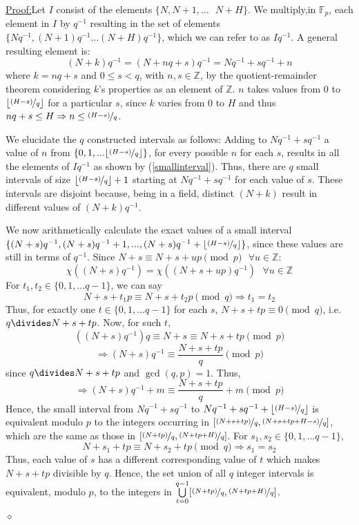 \documentclass{report}
\newenvironment{claimproof}[1]{\vspace{2.5mm}\par\noindent\underline{Proof:}\space#1}{\hfill $\diamond$ \vspace{2.5mm} \par}
\begin{document}
\begin{claimproof}
Let $I$ consist of the elements $\{N,N+1,...\text{ }N+H\}$. We multiply,in $\mathbb{F}_p$, each element in $I$ by $q^{-1}$ resulting in the set of elements $\{Nq^{-1},(N+1)q^{-1}...(N+H)q^{-1}\}$, which we can refer to as $Iq^{-1}$. A general resulting element is:
\begin{equation} \label{smallinterval}
    (N+k)q^{-1}=(N+nq+s)q^{-1}=Nq^{-1}+sq^{-1}+n
\end{equation}
where $k=nq+s$ and $0\leq s<q$, with $n,s\in\mathbb{Z}$, by the quotient-remainder theorem considering $k$'s properties as an element of $\mathbb{Z}$. $n$ takes values from $0$ to $\lfloor\nicefrac{(H-s)}{q}\rfloor$ for a particular $s$, since $k$ varies from $0$ to $H$ and thus $nq+s\leq H \Rightarrow n\leq \nicefrac{(H-s)}{q}$.

We elucidate the $q$ constructed intervals as follows: Adding to $Nq^{-1}+sq^{-1}$ a value of $n$ from $\{0,1,...\lfloor\nicefrac{(H-s)}{q}\rfloor\}$, for every possible $n$ for each $s$, results in all the elements of $Iq^{-1}$ as shown by (\ref{smallinterval}). Thus, there are $q$ small intervals of size $\lfloor\nicefrac{(H-s)}{q}\rfloor +1$ starting at $Nq^{-1}+sq^{-1}$ for each value of $s$. These intervals are disjoint because, being in a field, distinct $(N+k)$ result in different values of $(N+k)q^{-1}$.

We now arithmetically calculate the exact values of a small interval $\{(N+s)q^{-1},(N+s)q^{-1}+1, ...,(N+s)q^{-1}+\lfloor\nicefrac{(H-s)}{q}\rfloor\}$, since these values are still in terms of $q^{-1}$. Since $N+s\equiv N+s+up\pmod p  \text{ } \forall u\in \mathbb{Z}$:
\[\chi((N+s)q^{-1})=\chi((N+s+up)q^{-1}) \text{  } \forall u\in \mathbb{Z}\]
For $t_1,t_2\in\{0, 1,... q-1\}$, we can say
\[N+s+t_1p \equiv N+s+t_2p \pmod q \Rightarrow t_1=t_2\]
Thus, for exactly one $t\in\{0, 1,... q-1\}$ for each $s$, $N+s+tp \equiv 0 \pmod q$, i.e. $q\divides N+s+tp$. Now, for such $t$,
\[((N+s)q^{-1})q\equiv N+s \equiv N+s+tp \pmod p\]
\[\Rightarrow (N+s)q^{-1} \equiv \frac{N+s+tp}{q} \pmod p\]
since $q\divides N+s+tp$ and $\gcd (q,p)=1$. Thus,
\[\Rightarrow (N+s)q^{-1} + m\equiv \frac{N+s+tp}{q} + m \pmod p\]
Hence, the small interval from $Nq^{-1}+sq^{-1}$ to $Nq^{-1}+sq^{-1} + \lfloor\nicefrac{(H-s)}{q}\rfloor$ is equivalent modulo $p$ to the integers occurring in $[\nicefrac{(N+s+tp)}{q},\nicefrac{(N+s+tp+H-s)}{q}]$, which are the same as those in $[\nicefrac{(N+tp)}{q},\nicefrac{(N+tp+H)}{q}]$. For $s_1,s_2\in\{0, 1,... q-1\}$,
\[N+s_1+tp \equiv N+s_2+tp \pmod q \Rightarrow s_1=s_2\]
Thus, each value of $s$ has a different corresponding value of $t$ which makes $ N+s+tp$ divisible by $q$. Hence, the set union of all $q$ integer intervals is equivalent, modulo $p$, to the integers in $\bigcup\limits_{t=0}^{q-1} [\nicefrac {(N+tp)} {q},\nicefrac {(N+tp+H)}{q}]$.


\end{claimproof}
\end{document}
